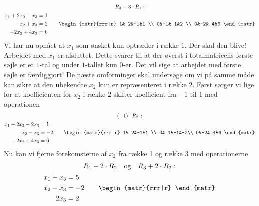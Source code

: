 \begin{example}
\begin{equation} 
\begin{gathered}
R_3 - 3\cdot R_1: \\
\begin{aligned}
x_1+ 2x_2 - x_3&=1\\
-x_2+x_3&=2 \\
-2x_2+4x_3&=6
\end{aligned}
\quad \quad
\begin{matr}{rrr|r}
 1& 2&-1&1 \\
 0&-1& 1&2 \\
 0&-2& 4&6
\end{matr}
\end{gathered}
\end{equation}
Vi har nu opnået at $x_1$ som ønsket kun optræder i række $1$. Der skal den blive! Arbejdet med $x_1$ er afsluttet. Dette svarer til at der øverst i totalmatricens første søjle er et $1$-tal og under $1$-tallet kun $0$-er. Det vil sige at arbejdet med første søjle er færdiggjort!\bs
De næste omforminger skal undersøge om vi på samme måde kan sikre at den ubekendte $x_2$ kun er repræsenteret i række $2$. Først sørger vi lige for at koefficienten for $x_2$ i række $2$ skifter koefficient fra $-1$ til $1$ med operationen
\begin{equation}
\begin{gathered}
(-1)\cdot R_2\,: \\
\begin{aligned}
x_1+2x_2-2x_3&=1\\
x_2-x_3&=-2 \\
-2x_2+4x_3&=6
\end{aligned}
\quad \quad
\begin{matr}{rrr|r}
 1& 2&-1&1 \\
 0& 1&-1&-2\\
 0&-2& 4&6
\end{matr}
\end{gathered}
\end{equation}
Nu kan vi fjerne forekomsterne af $x_2$ fra række 1 og række 3 med operationerne
\begin{equation}
\begin{gathered}
R_1 - 2\cdot R_2 \quad \mathrm{og} \quad R_3 + 2\cdot R_2: \\
\begin{aligned}
x_1+x_3&=5\\
x_2-x_3&=-2 \\
2x_3&=2
\end{aligned}
\quad \quad
\begin{matr}{rrr|r}

\end{matr}
\end{gathered}
\end{equation}
\end{example}
